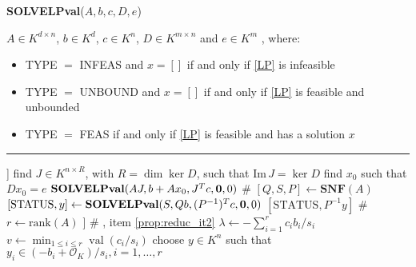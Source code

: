 \documentclass[a4paper,oneside,11pt]{article}
\DeclareMathOperator{\val}{val}
\newcommand{\OK}{\mathcal{O}_K}
\begin{document}
\begin{algorithm}
    \caption{\textbf{SOLVELPval}($A,b,c,D,e$)}\label{algo_LP}
    \begin{algorithmic}[1]
      \REQUIRE
      $A \in K^{d\times n}$, $b \in K^d$, $c \in K^n$, $D \in K^{m \times n}$ and $e \in K^m$
      \ENSURE [TYPE, $x$], where:
      \vspace{-0.25cm}
      \begin{itemize}
      \item[]
        TYPE $=$ INFEAS and $x=[]$ if and only if \eqref{LP} is infeasible
      \vspace{-0.25cm}
      \item[]
        TYPE $=$ UNBOUND and $x=[]$ if and only if \eqref{LP} is feasible and unbounded
      \vspace{-0.25cm}
      \item[]
        TYPE $=$ FEAS if and only if \eqref{LP} is feasible and has a solution $x$
      \end{itemize}
      \vspace{-0.1cm}
      \hrule
      \vspace{0.1cm}
        \RETURN [INFEAS, []] \label{step:linear_empty}
      \ENDIF
       \label{step:reducD:begin}
        \STATE find $J \in K^{n \times R}$, with $R = \dim\ker D$, such that $\text{Im}\, J = \ker D$
        \STATE find $x_0$ such that $Dx_0=e$ \label{step:reducD:end}
        \RETURN $\textbf{SOLVELPval}(AJ,b+A x_0,J^T c, {\bf 0},0)$ \label{step:reducD} \hfill {\color{olive} \# }
      \ENDIF
       \label{step:solsLP:begin}
        \STATE $[Q,S,P] \leftarrow \textbf{SNF}(A)$
        \STATE $[\mathrm{STATUS}, y] \leftarrow \textbf{SOLVELPval}(S,Qb,(P^{-1})^Tc,{\bf 0},0)$ \label{step:solsLP:end}
        \RETURN $[\mathrm{STATUS}, P^{-1}y]$ \hfill \color{olive} \#  \label{step:solsLP}
      \ENDIF
      \STATE $r \leftarrow \text{rank}(A)$ \label{step:core:begin}
      \IF{$\bigwedge_{i=r+1}^d \val(b_{i}) \geq 0$} \label{step:condition}
        \RETURN [UNBOUND, []] \hfill {\color{olive} \# , item \ref{prop:reduc_it2}} \label{step:unbound}
        \ELSE
          \STATE $\lambda \leftarrow -\sum_{i=1}^r c_i b_i / s_i$
          \STATE $v \leftarrow \min_{1 \leq i \leq r} \val (c_i/s_i)$
          \IF{$\val \lambda < v$}
            \STATE choose $y \in K^n$ such that $y_i \in (-b_i+\OK)/s_i, i=1,\ldots,r$

\end{algorithmic}
\end{algorithm}
\end{document}

